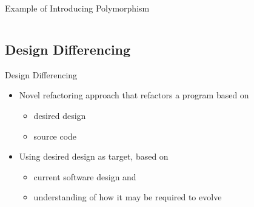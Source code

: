 \documentclass{beamer}
\begin{document}
\begin{frame}[fragile]{Example of Introducing Polymorphism}
  \begin{columns}[T]
    \begin{column}{.49\textwidth}
      
    \end{column}
    \begin{column}{.5\textwidth}
      
    \end{column}
  \end{columns}
\end{frame}

\subsection{Design Differencing}

\begin{frame}{Design Differencing}
  
  \begin{itemize}
    \item Novel refactoring approach that refactors a program based on 
    \begin{itemize}
      \item desired design
      \item source code
    \end{itemize}
    \pause
    \item Using desired design as target, based on
    \begin{itemize}
      \item current software design and
      \item understanding of how it may be required to evolve
    \end{itemize}
  \end{itemize}
\end{frame}
\end{document}
